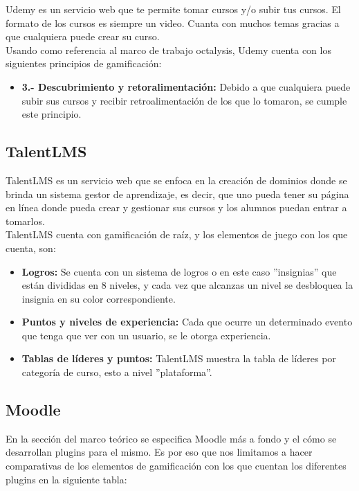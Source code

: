 \begin{multicols}{2}
    Udemy es un servicio web que te permite tomar cursos y/o subir tus cursos. El formato de los cursos es siempre un video. Cuanta con muchos temas gracias a que cualquiera puede crear su curso.\\
    \noindent Usando como referencia al marco de trabajo octalysis, Udemy cuenta con los siguientes principios de gamificación:
    \begin{itemize}
        \item \textbf{ 3.- Descubrimiento y retoralimentación: } Debido a que cualquiera puede subir sus cursos y recibir retroalimentación de los que lo tomaron, se cumple este principio.
    \end{itemize}
    
\subsection*{TalentLMS}

    TalentLMS es un servicio web que se enfoca en la creación de dominios donde se brinda un sistema gestor de aprendizaje, es decir, que uno pueda tener su página en línea donde pueda crear y gestionar sus cursos y los alumnos puedan entrar a tomarlos.\\
    
    \noindent TalentLMS cuenta con gamificación de raíz, y los elementos de juego con los que cuenta, son:
    \begin{itemize} 
        \item \textbf{Logros: } Se cuenta con un sistema de logros o en este caso ''insignias'' que están divididas en 8 niveles, y cada vez que alcanzas un nivel se desbloquea la insignia en su color correspondiente.
        \item \textbf{Puntos y niveles de experiencia: } Cada que ocurre un determinado evento que tenga que ver con un usuario, se le otorga experiencia.
        \item \textbf{Tablas de líderes y puntos: } TalentLMS muestra la tabla de líderes por categoría de curso, esto a nivel ''plataforma''.
    \end{itemize}
\end{multicols}

\clearpage
\subsection{Moodle}
   
   En la sección del marco teórico se especifica Moodle más a fondo y el cómo se desarrollan plugins para el mismo. Es por eso que nos limitamos a hacer comparativas de los elementos de gamificación con los que cuentan los diferentes plugins en la siguiente tabla:

